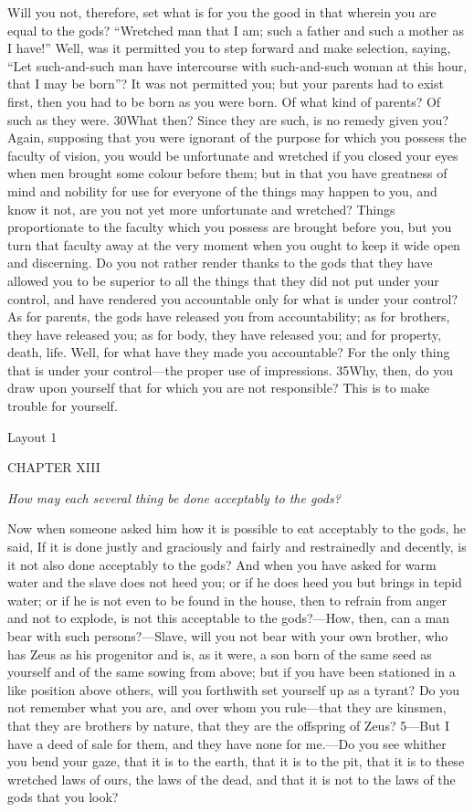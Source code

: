 Will you not, therefore, set what is for you the good in that wherein you are equal to the gods? ``Wretched man that I am; such a father and such a mother as I have!'' Well, was it permitted you to step forward and make selection, saying, ``Let such-and-such man have intercourse with such-and-such woman at this hour, that I may be born''? It was not permitted you; but your parents had to exist first, then you had to be born as you were born. Of what kind of parents? Of such as they were. 30What then? Since they are such, is no remedy given you? Again, supposing that you were ignorant of the purpose for which you possess the faculty of vision, you would be unfortunate and wretched if you closed your eyes when men brought some colour before them; but in that you have greatness of mind and nobility for use for everyone of the things may happen to you, and know it not, are you not yet more unfortunate and wretched? Things proportionate to the faculty which you possess are brought before you, but you turn that faculty away at the very moment when you ought to keep it wide open and discerning. Do you not rather render thanks to the gods that they have allowed you to be superior to all the things that they did not put under your control, and have rendered you accountable only for what is under your control? As for parents, the gods have released you from accountability; as for brothers, they have released you; as for body, they have released you; and for property, death, life. Well, for what have they made you accountable? For the only thing that is under your control—the proper use of impressions. 35Why, then, do you draw upon yourself that for which you are not responsible? This is to make trouble for yourself.



Layout 1

CHAPTER XIII

\emph{How may each several thing be done acceptably to the gods?}

Now when someone asked him how it is possible to eat acceptably to the gods, he said, If it is done justly and graciously and fairly and restrainedly and decently, is it not also done acceptably to the gods? And when you have asked for warm water and the slave does not heed you; or if he does heed you but brings in tepid water; or if he is not even to be found in the house, then to refrain from anger and not to explode, is not this acceptable to the gods?—How, then, can a man bear with such persons?—Slave, will you not bear with your own brother, who has Zeus as his progenitor and is, as it were, a son born of the same seed as yourself and of the same sowing from above; but if you have been stationed in a like position above others, will you forthwith set yourself up as a tyrant? Do you not remember what you are, and over whom you rule—that they are kinsmen, that they are brothers by nature, that they are the offspring of Zeus? 5—But I have a deed of sale for them, and they have none for me.—Do you see whither you bend your gaze, that it is to the earth, that it is to the pit, that it is to these wretched laws of ours, the laws of the dead, and that it is not to the laws of the gods that you look?

